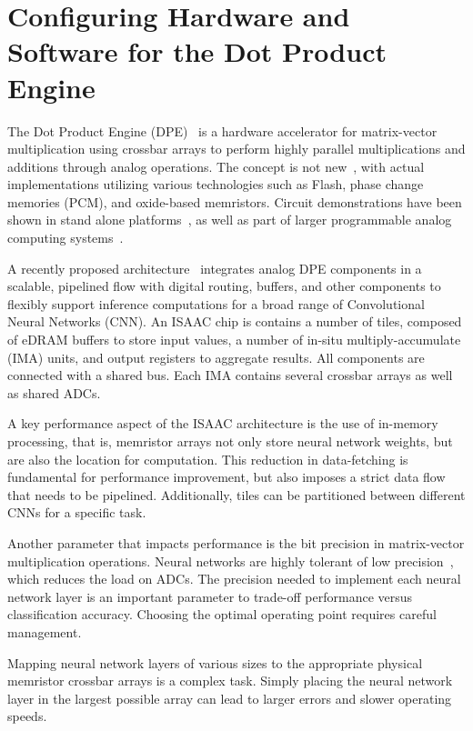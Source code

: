 \section{Configuring Hardware and Software for the Dot Product Engine}
\label{sec:configDPE}

The Dot Product Engine (DPE)~\cite{hu2016dot} is a hardware accelerator for
matrix-vector multiplication using crossbar arrays to perform highly parallel
multiplications and additions through analog operations.  The concept is not
new~\cite{steinbuch1961lernmatrix,likharev2011crossnets}, with actual
implementations utilizing various technologies such as Flash, phase change
memories (PCM), and oxide-based memristors.  Circuit demonstrations have been
shown in stand alone platforms~\cite{prezioso2015training}, as well as part of
larger programmable analog computing systems~\cite{george2016programmable}.

A recently proposed architecture~\cite{shafiee2016isaac} integrates analog DPE
components in a scalable, pipelined flow with digital routing, buffers, and
other components to flexibly support inference computations for a broad range
of Convolutional Neural Networks (CNN).  An ISAAC chip is contains a number of
tiles, composed of eDRAM buffers to store input values, a number of in-situ
multiply-accumulate (IMA) units, and output registers to aggregate results.
All components are connected with a shared bus.  Each IMA contains several
crossbar arrays as well as shared ADCs.

A key performance aspect of the ISAAC architecture is the use of in-memory
processing, that is, memristor arrays not only store neural network weights,
but are also the location for computation. This reduction in data-fetching is
fundamental for performance improvement, but also imposes a strict data flow
that needs to be pipelined. Additionally, tiles can be partitioned between
different CNNs for a specific task.

Another parameter that impacts performance is the bit precision in matrix-vector
multiplication operations. Neural networks are highly tolerant of low
precision~\cite{courbariaux2014low, rastegari2016xnor, zhou2016dorefa}, which
reduces the load on ADCs. The precision needed to implement each neural network
layer is an important parameter to trade-off performance versus classification
accuracy.  Choosing the optimal operating point requires careful management.

Mapping neural network layers of various sizes to the appropriate physical
memristor crossbar arrays is a complex task.   Simply placing the neural
network layer in the largest possible array can lead to larger errors and
slower operating speeds.

